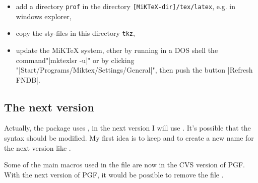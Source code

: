 \begin{enumerate}
            \begin{itemize}
              \item add a directory \texttt{prof} in the
                  directory \colorbox{blue!30}{\texttt{[MiKTeX-dir]/tex/latex}},
                  e.g. in windows explorer,
              \item copy the sty-files in this directory
                  \texttt{tkz},
              \item update the MiKTeX system, ether by running
                  in a DOS shell the command\newline "\colorbox{red!30}{|mktexlsr -u|}" \newline or by clicking\newline
                  "\colorbox{red!30}{|Start/Programs/Miktex/Settings/General|}", then
                  push the button \colorbox{red!30}{|Refresh FNDB|}.
            \end{itemize}
      \end{enumerate}

\subsection{The next version} 

Actually, the package uses , in the next version I will use . It's possible that the syntax should be modified. My first idea is to keep  and to create a new name for the next version like  .

Some of the main macros used in the file  are now in the CVS version of PGF. With the next version of PGF, it would be possible to remove the   file .
\endinput

